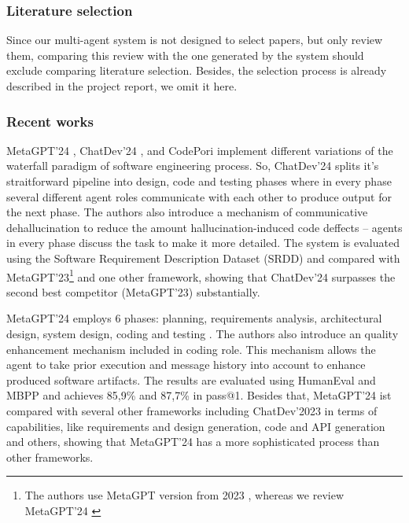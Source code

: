 \subsubsection{Literature selection}
\label{mas:literature}

Since our multi-agent system is not designed to select papers, but only review them, comparing this review with the one generated by the system should exclude comparing literature selection. Besides, the selection process is already described in the project report, we omit it here.

\subsubsection{Recent works}
\label{mas:contributions}


MetaGPT'24 \cite{hong2024metagptmetaprogrammingmultiagent}, ChatDev'24 \cite{qian2024chatdevcommunicativeagentssoftware}, and CodePori \cite{rasheed2024codeporilargescaleautonomoussoftware} implement different variations of the waterfall paradigm of software engineering process. So, ChatDev'24 splits it's straitforward pipeline into design, code and testing phases where in every phase several different agent roles communicate with each other to produce output for the next phase. The authors also introduce a mechanism of communicative dehallucination to reduce the amount hallucination-induced code deffects -- agents in every phase discuss the task to make it more detailed. The system is evaluated using the Software Requirement Description Dataset (SRDD)\cite{srdd} and compared with MetaGPT'23\footnote{The authors use MetaGPT version from 2023 \cite{metagpt23}, whereas we review MetaGPT'24 \cite{metagpt2024}} and one other framework, showing that ChatDev'24 surpasses the second best competitor (MetaGPT'23) substantially.

MetaGPT'24 \cite{hong2024metagptmetaprogrammingmultiagent} employs 6 phases: planning, requirements analysis, architectural design, system design, coding and testing . The authors also introduce an quality enhancement mechanism included in coding role. This mechanism allows the agent to take prior execution and message history into account to enhance produced software artifacts. The results are evaluated using HumanEval \cite{humaneval} and MBPP \cite{Cohan_2018} and achieves 85,9\% and 87,7\% in pass@1. Besides that, MetaGPT'24 ist compared with several other frameworks including ChatDev'2023 \cite{chatdev2023} in terms of capabilities,  like requirements and design generation, code and API generation and others, showing that MetaGPT'24 has a more sophisticated process than other frameworks.

